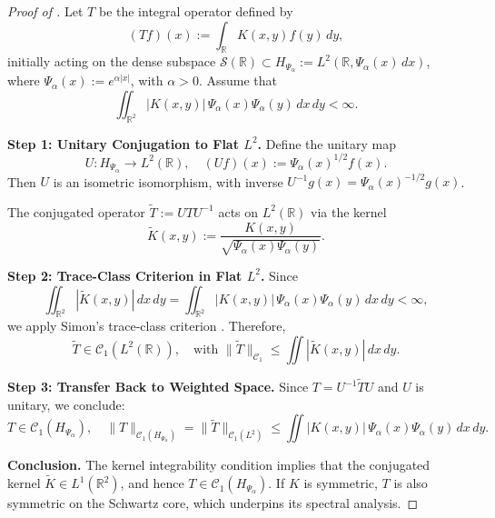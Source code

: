 \begin{proof}[Proof of ]
Let \( T \) be the integral operator defined by
\[
(Tf)(x) := \int_{\mathbb{R}} K(x, y) f(y) \, dy,
\]
initially acting on the dense subspace \( \mathcal{S}(\mathbb{R}) \subset H_{\Psi_\alpha} := L^2(\mathbb{R}, \Psi_\alpha(x)\, dx) \), where \( \Psi_\alpha(x) := e^{\alpha |x|} \), with \( \alpha > 0 \). Assume that
\[
\iint_{\mathbb{R}^2} |K(x, y)|\, \Psi_\alpha(x) \Psi_\alpha(y)\, dx\, dy < \infty.
\]

\medskip
\noindent\textbf{Step 1: Unitary Conjugation to Flat \( L^2 \).}
Define the unitary map
\[
U \colon H_{\Psi_\alpha} \to L^2(\mathbb{R}), \quad (Uf)(x) := \Psi_\alpha(x)^{1/2} f(x).
\]
Then \( U \) is an isometric isomorphism, with inverse \( U^{-1}g(x) = \Psi_\alpha(x)^{-1/2} g(x) \).

The conjugated operator \( \widetilde{T} := U T U^{-1} \) acts on \( L^2(\mathbb{R}) \) via the kernel
\[
\widetilde{K}(x, y) := \frac{K(x,y)}{\sqrt{\Psi_\alpha(x) \Psi_\alpha(y)}}.
\]

\medskip
\noindent\textbf{Step 2: Trace-Class Criterion in Flat \( L^2 \).}
Since
\[
\iint_{\mathbb{R}^2} |\widetilde{K}(x, y)|\, dx\, dy = \iint_{\mathbb{R}^2} |K(x, y)|\, \Psi_\alpha(x) \Psi_\alpha(y)\, dx\, dy < \infty,
\]
we apply Simon’s trace-class criterion \cite[Thm.~4.2]{Simon2005TraceIdeals}. Therefore,
\[
\widetilde{T} \in \mathcal{C}_1(L^2(\mathbb{R})), \quad \text{with } \|\widetilde{T}\|_{\mathcal{C}_1} \le \iint |\widetilde{K}(x, y)|\, dx\, dy.
\]

\medskip
\noindent\textbf{Step 3: Transfer Back to Weighted Space.}
Since \( T = U^{-1} \widetilde{T} U \) and \( U \) is unitary, we conclude:
\[
T \in \mathcal{C}_1(H_{\Psi_\alpha}), \quad \|T\|_{\mathcal{C}_1(H_{\Psi_\alpha})} = \|\widetilde{T}\|_{\mathcal{C}_1(L^2)} \le \iint |K(x, y)|\, \Psi_\alpha(x)\Psi_\alpha(y)\, dx\, dy.
\]

\medskip
\noindent\textbf{Conclusion.}
The kernel integrability condition implies that the conjugated kernel \( \widetilde{K} \in L^1(\mathbb{R}^2) \), and hence \( T \in \mathcal{C}_1(H_{\Psi_\alpha}) \). If \( K \) is symmetric, \( T \) is also symmetric on the Schwartz core, which underpins its spectral analysis.
\end{proof}
